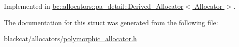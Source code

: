 Implemented in \hyperlink{structbc_1_1allocators_1_1pa__detail_1_1Derived__Allocator_a167659ce0c822b659fbd6ff3ced83876}{bc\+::allocators\+::pa\+\_\+detail\+::\+Derived\+\_\+\+Allocator$<$ Allocator $>$}.



The documentation for this struct was generated from the following file\+:\begin{DoxyCompactItemize}
\item 
blackcat/allocators/\hyperlink{polymorphic__allocator_8h}{polymorphic\+\_\+allocator.\+h}\end{DoxyCompactItemize}
